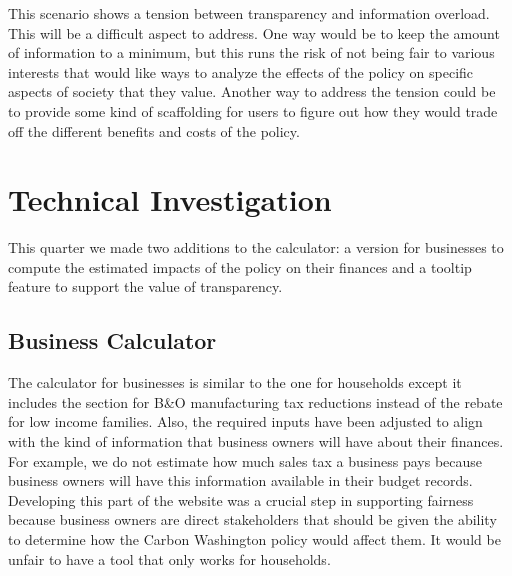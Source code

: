 \documentclass{sigchi}
\begin{document}
This scenario shows a tension between transparency and information overload. This will be a difficult aspect to address. 
One way would be to keep the amount of information to a minimum, but this runs the risk of not being fair to 
various interests that would like ways to analyze the effects of the policy on specific aspects of society that they value. 
Another way to address the tension could be to provide some kind of scaffolding for users to figure out how they would trade off 
the different benefits and costs of the policy. 

\section{Technical Investigation}
This quarter we made two additions to the calculator: a version for businesses to compute the estimated 
impacts of the policy on their finances and a tooltip feature to support the value of transparency. 

\subsection{Business Calculator}
The calculator for businesses is similar to the one for households except it includes the section 
for B\&O manufacturing tax reductions instead of the rebate for low income families. Also, the 
required inputs have been adjusted to align with the kind of information that business owners 
will have about their finances. For example, we do not estimate how much sales tax a business pays 
because business owners will have this information available in their budget records. Developing 
this part of the website was a crucial step in supporting fairness because business owners are 
direct stakeholders that should be given the ability to determine how the Carbon 
Washington policy would affect them. It would be unfair to have a tool that only works for 
households. 
\end{document}
